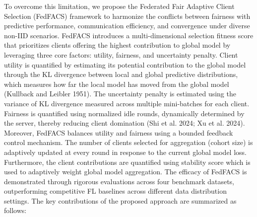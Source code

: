 \documentclass[pdflatex,sn-mathphys-num,oneside]{sn-jnl}%
\theoremstyle{thmstyleone}%
\theoremstyle{thmstyletwo}%
\theoremstyle{thmstylethree}%
\begin{document}
To overcome this limitation, we propose the Federated Fair Adaptive Client Selection (FedFACS) framework to harmonize the conflicts between fairness with predictive performance, communication efficiency, and convergence under diverse non-IID scenarios. FedFACS introduces a multi-dimensional selection fitness score that prioritizes clients offering the highest contribution to global model by leveraging three core factors: utility, fairness, and uncertainty penalty. Client utility is quantified by estimating its potential contribution to the global model through the KL divergence between local and global predictive distributions, which measures how far the local model has moved from the global model (Kullback and Leibler 1951). The uncertainty penalty is estimated using the variance of KL divergence measured across multiple mini-batches for each client. Fairness is quantified using normalized idle rounds, dynamically determined by the server, thereby reducing client domination (Shi et al. 2024; Xu et al. 2024). Moreover, FedFACS balances utility and fairness using a bounded feedback control mechanism. The number of clients selected for aggregation (cohort size) is adaptively updated at every round in response to the current global model loss. Furthermore, the client contributions are quantified using stability score which is used to adaptively weight global model aggregation. The efficacy of FedFACS is demonstrated through rigorous evaluations across four benchmark datasets, outperforming competitive FL baselines across different data distribution settings. The key contributions of the proposed approach are summarized as follows:
\end{document}
